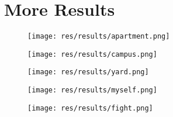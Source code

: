 
\section{More Results}
\begin{figure}[H]
  \centering
  \texttt{[image: res/results/apartment.png]}
\end{figure}
\begin{figure}[H]
  \centering
  \texttt{[image: res/results/campus.png]}
\end{figure}

\begin{figure}[H]
  \centering
  \texttt{[image: res/results/yard.png]}
\end{figure}

\begin{figure}[H]
  \centering
  \texttt{[image: res/results/myself.png]}
\end{figure}

\begin{figure}[H]
  \centering
  \texttt{[image: res/results/fight.png]}
\end{figure}

